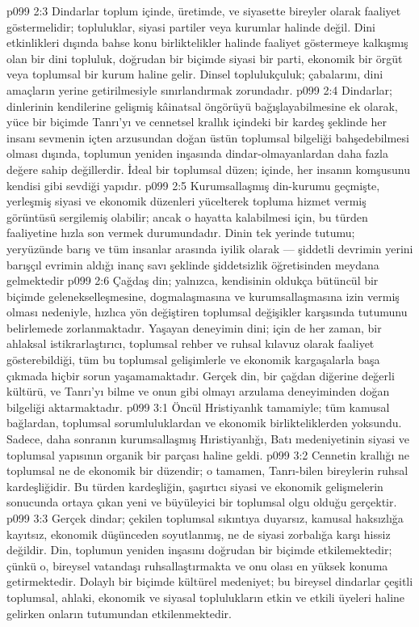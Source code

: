 \vs p099 2:3 Dindarlar toplum içinde, üretimde, ve siyasette bireyler olarak faaliyet göstermelidir; topluluklar, siyasi partiler veya kurumlar halinde değil. Dini etkinlikleri dışında bahse konu birliktelikler halinde faaliyet göstermeye kalkışmış olan bir dini topluluk, doğrudan bir biçimde siyasi bir parti, ekonomik bir örgüt veya toplumsal bir kurum haline gelir. Dinsel toplulukçuluk; çabalarını, dini amaçların yerine getirilmesiyle sınırlandırmak zorundadır.
\vs p099 2:4 Dindarlar; dinlerinin kendilerine gelişmiş kâinatsal öngörüyü bağışlayabilmesine ek olarak, yüce bir biçimde Tanrı’yı ve cennetsel krallık içindeki bir kardeş şeklinde her insanı sevmenin içten arzusundan doğan üstün toplumsal bilgeliği bahşedebilmesi olması dışında, toplumun yeniden inşasında dindar\hyp{}olmayanlardan daha fazla değere sahip değillerdir. İdeal bir toplumsal düzen; içinde, her insanın komşusunu kendisi gibi sevdiği yapıdır.
\vs p099 2:5 Kurumsallaşmış din\hyp{}kurumu geçmişte, yerleşmiş siyasi ve ekonomik düzenleri yücelterek topluma hizmet vermiş görüntüsü sergilemiş olabilir; ancak o hayatta kalabilmesi için, bu türden faaliyetine hızla son vermek durumundadır. Dinin tek yerinde tutumu; yeryüzünde barış ve tüm insanlar arasında iyilik olarak --- şiddetli devrimin yerini barışçıl evrimin aldığı inanç savı şeklinde şiddetsizlik öğretisinden meydana gelmektedir
\vs p099 2:6 Çağdaş din; yalnızca, kendisinin oldukça bütüncül bir biçimde gelenekselleşmesine, dogmalaşmasına ve kurumsallaşmasına izin vermiş olması nedeniyle, hızlıca yön değiştiren toplumsal değişikler karşısında tutumunu belirlemede zorlanmaktadır. Yaşayan deneyimin dini; için de her zaman, bir ahlaksal istikrarlaştırıcı, toplumsal rehber ve ruhsal kılavuz olarak faaliyet gösterebildiği, tüm bu toplumsal gelişimlerle ve ekonomik kargaşalarla başa çıkmada hiçbir sorun yaşamamaktadır. Gerçek din, bir çağdan diğerine değerli kültürü, ve Tanrı’yı bilme ve onun gibi olmayı arzulama deneyiminden doğan bilgeliği aktarmaktadır.
\vs p099 3:1 Öncül Hristiyanlık tamamiyle; tüm kamusal bağlardan, toplumsal sorumluluklardan ve ekonomik birlikteliklerden yoksundu. Sadece, daha sonranın kurumsallaşmış Hıristiyanlığı, Batı medeniyetinin siyasi ve toplumsal yapısının organik bir parçası haline geldi.
\vs p099 3:2 Cennetin krallığı ne toplumsal ne de ekonomik bir düzendir; o tamamen, Tanrı\hyp{}bilen bireylerin ruhsal kardeşliğidir. Bu türden kardeşliğin, şaşırtıcı siyasi ve ekonomik gelişmelerin sonucunda ortaya çıkan yeni ve büyüleyici bir toplumsal olgu olduğu gerçektir.
\vs p099 3:3 Gerçek dindar; çekilen toplumsal sıkıntıya duyarsız, kamusal haksızlığa kayıtsız, ekonomik düşünceden soyutlanmış, ne de siyasi zorbalığa karşı hissiz değildir. Din, toplumun yeniden inşasını doğrudan bir biçimde etkilemektedir; çünkü o, bireysel vatandaşı ruhsallaştırmakta ve onu olası en yüksek konuma getirmektedir. Dolaylı bir biçimde kültürel medeniyet; bu bireysel dindarlar çeşitli toplumsal, ahlaki, ekonomik ve siyasal toplulukların etkin ve etkili üyeleri haline gelirken onların tutumundan etkilenmektedir.
